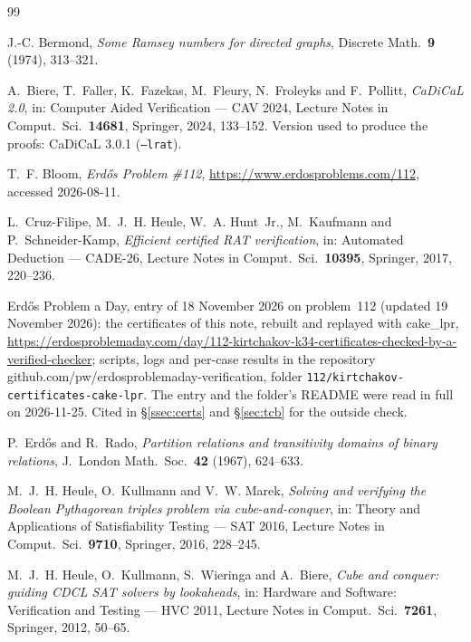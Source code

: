 \documentclass[11pt]{amsart}
\theoremstyle{plain}
\theoremstyle{definition}
\theoremstyle{remark}
\begin{document}
\begin{thebibliography}{99}
\footnotesize

J.-C. Bermond,
\emph{Some Ramsey numbers for directed graphs},
Discrete Math.\ \textbf{9} (1974), 313--321.

A.~Biere, T.~Faller, K.~Fazekas, M.~Fleury, N.~Froleyks and F.~Pollitt,
\emph{CaDiCaL 2.0},
in: Computer Aided Verification --- CAV 2024, Lecture Notes in Comput.\
Sci.\ \textbf{14681}, Springer, 2024, 133--152. Version used to produce
the proofs: CaDiCaL 3.0.1 (\texttt{--lrat}).

T.~F. Bloom, \emph{Erd\H{o}s Problem \#112},
\url{https://www.erdosproblems.com/112}, accessed 2026-08-11.

L.~Cruz-Filipe, M.~J.~H. Heule, W.~A. Hunt~Jr., M.~Kaufmann and
P.~Schneider-Kamp,
\emph{Efficient certified RAT verification},
in: Automated Deduction --- CADE-26, Lecture Notes in Comput.\ Sci.\
\textbf{10395}, Springer, 2017, 220--236.

Erd\H{o}s Problem a Day, entry of 18 November 2026 on problem~112
(updated 19 November 2026): the certificates of this note, rebuilt and
replayed with cake\_lpr,
\url{https://erdosproblemaday.com/day/112-kirtchakov-k34-certificates-checked-by-a-verified-checker};
scripts, logs and per-case results in the repository
github.com/pw/erdosproblemaday-verification, folder
\texttt{112/kirtchakov-certificates-cake-lpr}. The entry and the folder's
README were read in full on 2026-11-25. Cited in \S\ref{ssec:certs} and
\S\ref{sec:tcb} for the outside check.

P.~Erd\H{o}s and R.~Rado,
\emph{Partition relations and transitivity domains of binary relations},
J.\ London Math.\ Soc.\ \textbf{42} (1967), 624--633.

M.~J.~H. Heule, O.~Kullmann and V.~W. Marek,
\emph{Solving and verifying the Boolean Pythagorean triples problem via
cube-and-conquer},
in: Theory and Applications of Satisfiability Testing --- SAT 2016,
Lecture Notes in Comput.\ Sci.\ \textbf{9710}, Springer, 2016, 228--245.

\bibitem[HKWB11]{HKWB11}
M.~J.~H. Heule, O.~Kullmann, S.~Wieringa and A.~Biere,
\emph{Cube and conquer: guiding CDCL SAT solvers by lookaheads},
in: Hardware and Software: Verification and Testing --- HVC 2011,
Lecture Notes in Comput.\ Sci.\ \textbf{7261}, Springer, 2012, 50--65.


\end{thebibliography}
\end{document}
